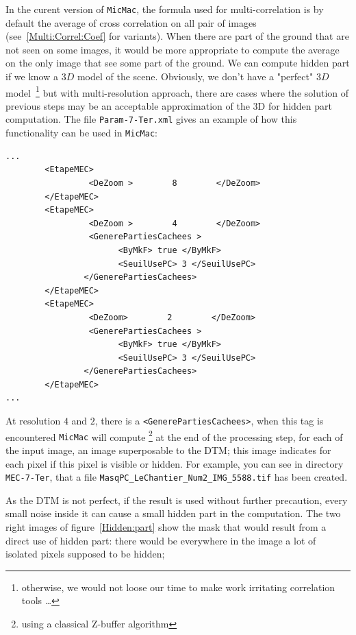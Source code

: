 In the curent version of {\tt MicMac},  the formula used for multi-correlation is
by default  the average of cross correlation on all pair of images (see~\ref{Multi:Correl:Coef}
for variants).  When there are  part of the ground that are not seen on some images,
it would be more appropriate to compute the average on the only image that see some
part of the ground. We can compute hidden part if we know a $3D$ model of the scene.
Obviously, we don't have a "perfect" $3D$ model~\footnote{otherwise, we would not loose our
time to make work irritating correlation tools \dots } but with multi-resolution
approach, there are cases where the solution of previous steps may be an acceptable
approximation of the 3D for hidden part computation.
The file {\tt Param-7-Ter.xml} gives an example of how this functionality
can be used in {\tt MicMac}:


{\scriptsize
\begin{verbatim}
...
        <EtapeMEC>
                 <DeZoom >        8        </DeZoom>
        </EtapeMEC>
        <EtapeMEC>
                 <DeZoom >        4        </DeZoom>
                 <GenerePartiesCachees >
                       <ByMkF> true </ByMkF>
                       <SeuilUsePC> 3 </SeuilUsePC>
                </GenerePartiesCachees>
        </EtapeMEC>
        <EtapeMEC>
                 <DeZoom>        2        </DeZoom>
                 <GenerePartiesCachees >
                       <ByMkF> true </ByMkF>
                       <SeuilUsePC> 3 </SeuilUsePC>
                </GenerePartiesCachees>
        </EtapeMEC>
...
\end{verbatim}
}


At resolution $4$ and $2$, there is a {\tt <GenerePartiesCachees>}, when this tag
is encountered {\tt MicMac} will compute \footnote{using a classical Z-buffer algorithm}
at the end of the processing
step, for each of the input image, an image
superposable to the DTM; this image indicates for each pixel if this pixel is visible
or hidden. For example, you can see in directory {\tt MEC-7-Ter}, that
a file {\tt  MasqPC\_LeChantier\_Num2\_IMG\_5588.tif} has been created.

As the DTM is not perfect,  if the result is used without further precaution,
every small noise inside it can cause a small hidden part in the computation.
The two right images of figure~\ref{Hidden:part} show the mask that would
result from a direct use of hidden part: there would be everywhere in
the image a lot of isolated pixels supposed to be hidden;

